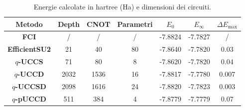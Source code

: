 \begin{table}[H]
    \centering
    \begin{tabular}{|c|c|c|c|c|c|c|}
    \hline
    \textbf{Metodo}                                                 & \textbf{Depth} & \textbf{CNOT} & \textbf{Parametri} & \textbf{$E_0$} & \textbf{$E_\infty$} & \textbf{$\Delta E_{\text{max}}$} \\ \hline
    \textbf{\color[HTML]{CB0000} FCI}          & /              & /             & /                  & -7.8824             & -7.7827                  & /                                     \\ \hline
    \textbf{\color[HTML]{32CB00} EfficientSU2} & 21             & 40            & 80                 & -7.8640             & -7.7820                  & 0.03                                  \\ \hline
    \textbf{\color[HTML]{036400} $q$-UCCS}     & 71             & 80            & 8                  & -7.8620             & -7.7820                  & 0.04                                  \\ \hline
    \textbf{\color[HTML]{34CDF9} $q$-UCCD}     & 2032           & 1536          & 16                 & -7.8817             & -7.7780                  & 0.007                                 \\ \hline
    \textbf{\color[HTML]{3531FF} $q$-UCCSD}    & 2098           & 1616          & 24                 & -7.8820             & -7.7823                  & 0.003                                 \\ \hline
    \textbf{\color[HTML]{D952D8} $q$-pUCCD}    & 511            & 384           & 4                  & -7.8779             & -7.7779                  & 0.07                                  \\ \hline     
\end{tabular}
\caption{Energie calcolate in hartree (Ha) e dimensioni dei circuiti.}
\label{tab:energie-e-circuiti}
\end{table}